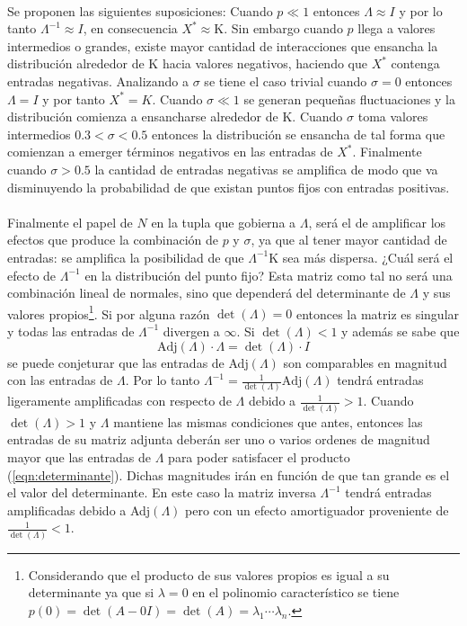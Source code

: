 \\
Se proponen las siguientes suposiciones: Cuando $p\ll 1$ entonces $\Lambda\approx I$ y por lo tanto $\Lambda^{-1}\approx I$, en consecuencia $X^* \approx \mathrm{K}$. Sin embargo cuando $p$ llega a valores intermedios o grandes, existe mayor cantidad de interacciones que ensancha la distribución alrededor de $\mathrm{K}$ hacia valores negativos, haciendo que $X^*$ contenga entradas negativas. Analizando a $\sigma$ se tiene el caso trivial cuando $\sigma=0$ entonces $\Lambda=I$ y por tanto $X^*=K$. Cuando $\sigma\ll 1$ se generan pequeñas fluctuaciones y la distribución comienza a ensancharse alrededor de $\mathrm{K}$. Cuando $\sigma$ toma valores intermedios $0.3<\sigma<0.5$ entonces la distribución se ensancha de tal forma que comienzan a emerger términos negativos en las entradas de $X^*$. Finalmente cuando $\sigma>0.5$ la cantidad de entradas negativas se amplifica de modo que va disminuyendo la probabilidad de que existan puntos fijos con entradas positivas.\\
\\
Finalmente el papel de $N$ en la tupla que gobierna a $\Lambda$, será el de amplificar los efectos que produce la combinación de $p$ y $\sigma$, ya que al tener mayor cantidad de entradas: se amplifica la posibilidad de que $\Lambda^{-1}\mathrm{K}$ sea más dispersa. ¿Cuál será el efecto de $\Lambda^{-1}$ en la distribución del punto fijo? Esta matriz como tal no será una combinación lineal de normales, sino que dependerá del determinante de $\Lambda$ y sus valores propios\footnote{Considerando que el producto de sus valores propios es igual a su determinante ya que si $\lambda=0$ en el polinomio característico se tiene $p(0)=\det(A-0I)=\det(A)=\lambda_1\cdots\lambda_n$.}. Si por alguna razón $\det(\Lambda)=0$ entonces la matriz es singular y todas las entradas de $\Lambda^{-1}$ divergen a $\infty$. Si $\det(\Lambda)<1$ y además se sabe que 
\begin{equation}\label{eqn:determinante}
	\text{Adj}(\Lambda)\cdot \Lambda = \det(\Lambda)\cdot I
\end{equation}
se puede conjeturar que las entradas de Adj$(\Lambda)$ son comparables en magnitud con las entradas de $\Lambda$. Por lo tanto $\Lambda^{-1}=\frac{1}{\det(\Lambda)}\text{Adj}(\Lambda)$ tendrá entradas ligeramente amplificadas con respecto de $\Lambda$ debido a $\frac{1}{\det(\Lambda)}>1$. Cuando $\det(\Lambda)>1$ y $\Lambda$ mantiene las mismas condiciones que antes, entonces las entradas de su matriz adjunta deberán ser uno o varios ordenes de magnitud mayor que las entradas de $\Lambda$ para poder satisfacer el producto (\ref{eqn:determinante}). Dichas magnitudes irán en función de que tan grande es el el valor del determinante. En este caso la matriz inversa $\Lambda^{-1}$ tendrá entradas amplificadas debido a Adj$(\Lambda)$ pero con un efecto amortiguador proveniente de $\frac{1}{\det(\Lambda)}<1$.
